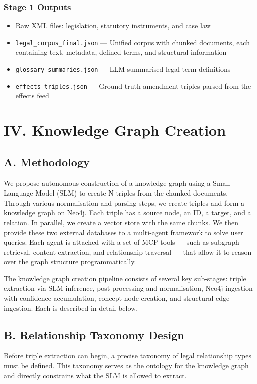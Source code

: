 \documentclass[10pt, a4paper, twocolumn]{article}
\begin{document}
\subsubsection*{Stage 1 Outputs}
\begin{itemize}
    \item Raw XML files: legislation, statutory instruments, and case law
    \item \texttt{legal\_corpus\_final.json} — Unified corpus with chunked documents, each containing text, metadata, defined terms, and structural information
    \item \texttt{glossary\_summaries.json} — LLM-summarised legal term definitions
    \item \texttt{effects\_triples.json} — Ground-truth amendment triples parsed from the effects feed
\end{itemize}

\section{IV. Knowledge Graph Creation}

\subsection{A. Methodology}
We propose autonomous construction of a knowledge graph using a Small Language Model (SLM) to create N-triples from the chunked documents. Through various normalisation and parsing steps, we create triples and form a knowledge graph on Neo4j. Each triple has a source node, an ID, a target, and a relation. In parallel, we create a vector store with the same chunks. We then provide these two external databases to a multi-agent framework to solve user queries. Each agent is attached with a set of MCP tools — such as subgraph retrieval, content extraction, and relationship traversal — that allow it to reason over the graph structure programmatically.

The knowledge graph creation pipeline consists of several key sub-stages: triple extraction via SLM inference, post-processing and normalisation, Neo4j ingestion with confidence accumulation, concept node creation, and structural edge ingestion. Each is described in detail below.

\subsection{B. Relationship Taxonomy Design}
Before triple extraction can begin, a precise taxonomy of legal relationship types must be defined. This taxonomy serves as the ontology for the knowledge graph and directly constrains what the SLM is allowed to extract.
\end{document}

